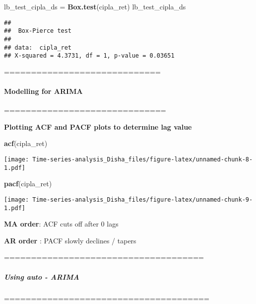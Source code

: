 \documentclass[
]{article}
\newenvironment{Shaded}{\begin{snugshade}}{\end{snugshade}}
\newcommand{\FunctionTok}[1]{\textcolor[rgb]{0.13,0.29,0.53}{\textbf{#1}}}
\newcommand{\NormalTok}[1]{#1}
\newcommand{\OtherTok}[1]{\textcolor[rgb]{0.56,0.35,0.01}{#1}}
\begin{document}
\begin{Shaded}
\begin{Highlighting}[]
\NormalTok{lb\_test\_cipla\_ds }\OtherTok{=} \FunctionTok{Box.test}\NormalTok{(cipla\_ret)}
\NormalTok{lb\_test\_cipla\_ds}
\end{Highlighting}
\end{Shaded}

\begin{verbatim}
## 
##  Box-Pierce test
## 
## data:  cipla_ret
## X-squared = 4.3731, df = 1, p-value = 0.03651
\end{verbatim}

=============================

\hypertarget{modelling-for-arima}{%
\paragraph{\texorpdfstring{\textbf{Modelling for
ARIMA}}{Modelling for ARIMA}}\label{modelling-for-arima}}

==============================

\textbf{Plotting ACF and PACF plots to determine lag value}

\begin{Shaded}
\begin{Highlighting}[]
\FunctionTok{acf}\NormalTok{(cipla\_ret)}
\end{Highlighting}
\end{Shaded}

\texttt{[image: Time-series-analysis\_Disha\_files/figure-latex/unnamed-chunk-8-1.pdf]}

\begin{Shaded}
\begin{Highlighting}[]
\FunctionTok{pacf}\NormalTok{(cipla\_ret)}
\end{Highlighting}
\end{Shaded}

\texttt{[image: Time-series-analysis\_Disha\_files/figure-latex/unnamed-chunk-9-1.pdf]}

\textbf{MA order}: ACF cuts off after 0 lags

\textbf{AR order} : PACF slowly declines / tapers

=====================================

\hypertarget{using-auto---arima}{%
\subparagraph{\texorpdfstring{\textbf{Using auto -
ARIMA}}{Using auto - ARIMA}}\label{using-auto---arima}}

======================================
\end{document}
